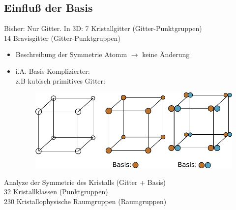 \subsection{Einfluß der Basis} \label{kap:2_2}
Bisher: Nur Gitter. In 3D: 7 Kristallgitter (Gitter-Punktgruppen)\\
14 Bravisgitter (Gitter-Punktgruppen)\\
\begin{itemize}
    \item Beschreibung der Symmetrie Atomm $\rightarrow$ keine Änderung
    \item i.A. Basis Komplizierter:\\
    z.B kubisch primitives Gitter:
    \begin{figure}[H]
        \centering
        \includegraphics{figures/2_2Cubes.pdf}
        \caption{}
        \label{}
    \end{figure}
\end{itemize}
Analyze der Symmetrie des Kristalls (Gitter + Basis)\\
32 Kristallklassen (Punktgruppen)\\
230 Kristallophysische Raumgruppen (Raumgruppen)\\

